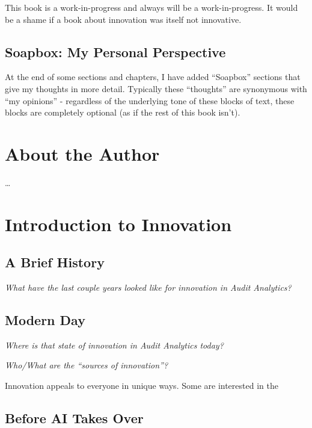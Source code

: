 \documentclass[
]{book}
\theoremstyle{definition}
\theoremstyle{definition}
\theoremstyle{definition}
\theoremstyle{definition}
\theoremstyle{remark}
\begin{document}
This book is a work-in-progress and always will be a work-in-progress. It would
be a shame if a book about innovation was itself not innovative.

\hypertarget{soapbox-my-personal-perspective}{%
\section*{Soapbox: My Personal Perspective}\label{soapbox-my-personal-perspective}}

At the end of some sections and chapters, I have added ``Soapbox'' sections that
give my thoughts in more detail. Typically these ``thoughts'' are synonymous with
``my opinions'' - regardless of the underlying tone of these blocks of text, these
blocks are completely optional (as if the rest of this book isn't).

\hypertarget{about-the-author}{%
\chapter*{About the Author}\label{about-the-author}}

\ldots{}

\hypertarget{introduction-to-innovation}{%
\chapter{Introduction to Innovation}\label{introduction-to-innovation}}

\hypertarget{a-brief-history}{%
\section{A Brief History}\label{a-brief-history}}

\emph{What have the last couple years looked like for innovation in Audit Analytics?}

\hypertarget{modern-day}{%
\section{Modern Day}\label{modern-day}}

\emph{Where is that state of innovation in Audit Analytics today?}

\emph{Who/What are the ``sources of innovation''?}

Innovation appeals to everyone in unique ways. Some are interested in the

\hypertarget{before-ai-takes-over}{%
\section{Before AI Takes Over}\label{before-ai-takes-over}}
\end{document}
